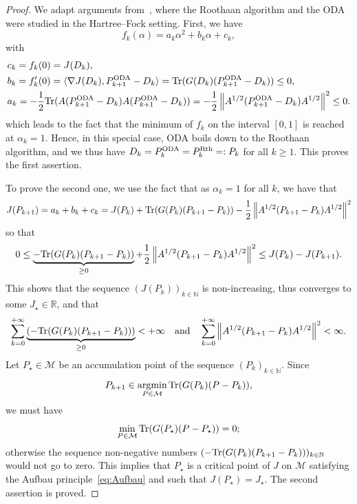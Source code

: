 \documentclass{article}
\def\N{\mathbb N}
\def\R{\mathbb R}
\newcommand{\tr}{{\rm Tr}}
\newcommand{\1}{{\mathds 1}}
\begin{document}
\begin{proof} We adapt arguments from~\cite{cances2000b,cances2000c,levitt2012b,levitt2012b}, where the Roothaan algorithm and the ODA were studied in the Hartree--Fock setting. First, we have
$$
f_{k}(\alpha) = a_{k} \alpha^2 + b_{k} \alpha + c_{k},
$$
with 
\begin{align*}
& c_k= f_k(0) =J(D_{k}), \\
& b_k= f_{k}'(0) = \langle \nabla J(D_k), P_{k+1}^{\rm ODA}-D_k \rangle =  \tr(G(D_k) (P_{k+1}^{\rm ODA}-D_k )) \leq 0, \\
& a_{k} = - \frac{1}{2} \tr( A (P_{k+1}^{\rm ODA}-D_k ) A(P_{k+1}^{\rm ODA}-D_k))  = - \frac{1}{2} \left\| A^{1/2} (P_{k+1}^{\rm ODA}-D_k ) A^{1/2} \right\|^2 \leq 0.
\end{align*}
which leads to the fact that the minimum of $f_k$ on the interval $[0,1]$ is reached at $\alpha_k = 1$. Hence, in this special case, ODA boils down to the Roothaan algorithm, and we thus have $D_k=P_k^{\rm ODA}=P_k^{\rm Rth}=:P_k$ for all $k \ge 1$. This proves the first assertion. 

\medskip

To prove the second one, we use the fact that as $\alpha_k=1$ for all $k$, we have that
\begin{align*}
J(P_{k+1}) &=   a_{k}  + b_{k} + c_{k} = J(P_{k}) + \tr(G(P_k) (P_{k+1}-P_k )) - \frac{1}{2} \left\| A^{1/2} (P_{k+1}-P_k ) A^{1/2} \right\|^2 \\
\end{align*}
so that 
\begin{align}
  0 \le \underbrace{- \tr(G(P_k) (P_{k+1}-P_k ))}_{\ge 0} +  \frac{1}{2} \left\| A^{1/2} (P_{k+1}-P_k ) A^{1/2} \right\|^2 \le J(P_{k})-J(P_{k+1}).
  \label{eq:ineq_preL}
\end{align}
This shows that the sequence $(J(P_k))_{k \in \N}$ is non-increasing, thus converges to some $J_\star \in \R$, and that
\begin{equation} \label{eq:bound_series_ODA}
\sum_{k=0}^{+\infty} \underbrace{(-\tr(G(P_k) (P_{k+1}-P_k )))}_{\ge  0}  < +\infty \quad \mbox{and} \quad \sum_{k=0}^{+\infty}  \left\| A^{1/2} (P_{k+1}-P_k ) A^{1/2} \right\|^2< \infty.
\end{equation}
Let $P_\star \in \mathcal M$ be an accumulation point of the sequence $(P_k)_{k \in \N}$. Since 
$$
P_{k+1} \in \mathop{\rm argmin}_{P \in \mathcal M} \tr(G(P_k)(P-P_k)),
$$
we must have
$$
\min_{P \in \mathcal M} \tr(G(P_\star) (P-P_\star )) =0;
$$
otherwise the sequence non-negative numbers $(-\tr(G(P_k) (P_{k+1}-P_k )))_{k \in \N}$ would not go to zero. This implies that $P_\star$ is a critical point of $J$ on $\mathcal M$ satisfying the Aufbau principle~\eqref{eq:Aufbau} and such that $J(P_\star)=J_\star$. The second assertion is proved.


\end{proof}
\end{document}

